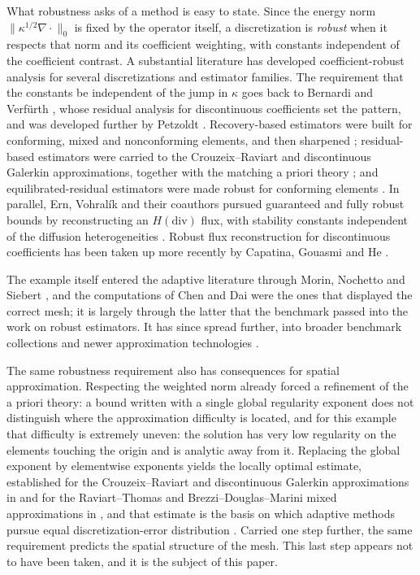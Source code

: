 \documentclass[10pt,pdftex]{amsart}%
\numberwithin{equation}{section}
\begin{document}
What robustness asks of a method is easy to state.  Since the energy norm $\|\kappa^{1/2}\nabla\cdot\|_0$ is fixed by the operator itself, a discretization is \emph{robust} when it respects that norm and its coefficient weighting, with constants independent of the coefficient contrast.  A substantial literature has developed coefficient-robust analysis for several discretizations and estimator families.  The requirement that the constants be independent of the jump in $\kappa$ goes back to Bernardi and Verf\"urth \cite{BV}, whose residual analysis for discontinuous coefficients set the pattern, and was developed further by Petzoldt \cite{Petzoldt}.  Recovery-based estimators were built for conforming, mixed and nonconforming elements, and then sharpened \cite{CZ09,CZ10,CHZzz17}; residual-based estimators were carried to the Crouzeix--Raviart and discontinuous Galerkin approximations, together with the matching a priori theory \cite{CYZ11,CHZmc17,CHZ17}; and equilibrated-residual estimators were made robust for conforming elements \cite{CZ12,ZhangThesis}.  In parallel, Ern, Vohral\'ik and their coauthors pursued guaranteed and fully robust bounds by reconstructing an $H(\mathrm{div})$ flux, with stability constants independent of the diffusion heterogeneities \cite{ENV07,EV09,ESV10,Vohralik2011,DiPietroErn}. Robust flux reconstruction for discontinuous coefficients has been taken up more recently by Capatina, Gouasmi and He \cite{CGH24}.

The example itself entered the adaptive literature through Morin, Nochetto and Siebert \cite{MNS}, and the computations of Chen and Dai \cite{ChenDai} were the ones that displayed the correct mesh; it is largely through the latter that the benchmark passed into the work on robust estimators.  It has since spread further, into broader benchmark collections and newer approximation technologies \cite{Mitchell,IGAActa,LiuCai2022}.

The same robustness requirement also has consequences for spatial approximation. Respecting the weighted norm already forced a refinement of the a priori theory: a bound written with a single global regularity exponent does not distinguish where the approximation difficulty is located, and for this example that difficulty is extremely uneven: the solution has very low regularity on the elements touching the origin and is analytic away from it. Replacing the global exponent by elementwise exponents yields the locally optimal estimate, established for the Crouzeix--Raviart and discontinuous Galerkin approximations in \cite{CHZ17} and for the Raviart--Thomas and Brezzi--Douglas--Marini mixed approximations in \cite{Z20}, and that estimate is the basis on which adaptive methods pursue equal discretization-error distribution \cite{NV2012}.  Carried one step further, the same requirement predicts the spatial structure of the mesh.  This last step appears not to have been taken, and it is the subject of this paper.
\end{document}
